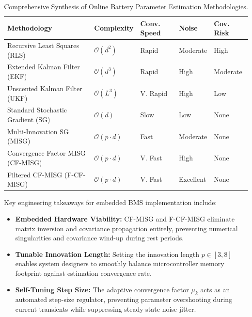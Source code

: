 \begin{table}[h!]
\centering
\footnotesize
\renewcommand{\arraystretch}{1.1}
\caption{Comprehensive Synthesis of Online Battery Parameter Estimation Methodologies.}
\label{tab:master_algorithm_synthesis}
\begin{tabularx}{\textwidth}{|>{\raggedright\arraybackslash}X|>{\centering\arraybackslash}p{1.3cm}|>{\centering\arraybackslash}p{1.3cm}|>{\centering\arraybackslash}p{1.2cm}|>{\centering\arraybackslash}p{1.2cm}|}
\hline
\textbf{Methodology} & \textbf{Complexity} & \textbf{Conv. Speed} & \textbf{Noise} & \textbf{Cov. Risk} \\ \hline
Recursive Least Squares (RLS) & $\mathcal{O}(d^2)$ & Rapid & Moderate & High \\ \hline
Extended Kalman Filter (EKF) & $\mathcal{O}(d^3)$ & Rapid & High & Moderate \\ \hline
Unscented Kalman Filter (UKF) & $\mathcal{O}(L^3)$ & V. Rapid & High & Low \\ \hline
Standard Stochastic Gradient (SG) & $\mathcal{O}(d)$ & Slow & Low & None \\ \hline
Multi-Innovation SG (MISG) & $\mathcal{O}(p \cdot d)$ & Fast & Moderate & None \\ \hline
Convergence Factor MISG (CF-MISG) & $\mathcal{O}(p \cdot d)$ & V. Fast & High & None \\ \hline
Filtered CF-MISG (F-CF-MISG) & $\mathcal{O}(p \cdot d)$ & V. Fast & Excellent & None \\ \hline
\end{tabularx}
\end{table}

Key engineering takeaways for embedded BMS implementation include:
\begin{itemize}
    \item \textbf{Embedded Hardware Viability:} CF-MISG and F-CF-MISG eliminate matrix inversion and covariance propagation entirely, preventing numerical singularities and covariance wind-up during rest periods.
    \item \textbf{Tunable Innovation Length:} Setting the innovation length $p \in [3, 8]$ enables system designers to smoothly balance microcontroller memory footprint against estimation convergence rate.
    \item \textbf{Self-Tuning Step Size:} The adaptive convergence factor $\mu_k$ acts as an automated step-size regulator, preventing parameter overshooting during current transients while suppressing steady-state noise jitter.
\end{itemize}

